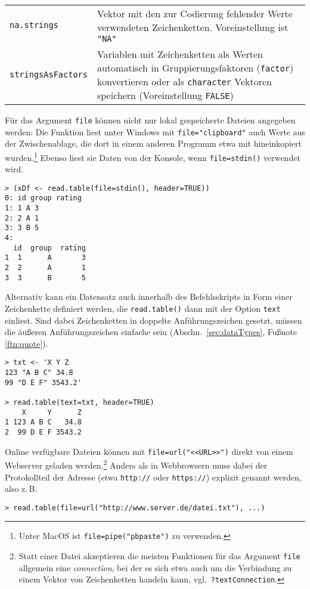 \begin{longtable}{p{3.2cm}p{9.3cm}}
\lstinline!na.strings! & Vektor mit den zur Codierung fehlender Werte verwendeten Zeichenketten. Voreinstellung ist \lstinline!"NA"!\\
\lstinline!stringsAsFactors!\index{Zeichenketten!Umwandlung in Faktor} & Variablen mit Zeichenketten als Werten automatisch in Gruppierungsfaktoren (\lstinline!factor!) konvertieren oder als \lstinline!character! Vektoren speichern (Voreinstellung \lstinline!FALSE!)\\\hline
\end{longtable}

Für das Argument \lstinline!file! können nicht nur lokal gespeicherte Dateien angegeben werden: Die Funktion liest unter Windows mit \lstinline!file="clipboard"! auch Werte aus der Zwischenablage, die dort in einem anderen Programm etwa mit  hineinkopiert wurden.\footnote{\label{ftn:pbpaste}Unter MacOS ist \lstinline!file=pipe("pbpaste")! zu verwenden.} Ebenso liest sie Daten von der Konsole, wenn \lstinline!file=stdin()! verwendet wird.
\begin{lstlisting}
> (xDf <- read.table(file=stdin(), header=TRUE))
0: id group rating
1: 1 A 3
2: 2 A 1
3: 3 B 5
4:
  id  group  rating
1  1      A       3
2  2      A       1
3  3      B       5
\end{lstlisting}

Alternativ kann ein Datensatz auch innerhalb des Befehlsskripts in Form einer Zeichenkette definiert werden, die \lstinline!read.table()! dann mit der Option \lstinline!text! einliest. Sind dabei Zeichenketten in doppelte Anführungszeichen gesetzt, müssen die äußeren Anführungszeichen einfache sein (Abschn.\ \ref{sec:dataTypes}, Fußnote \ref{ftn:quote}).
\begin{lstlisting}
> txt <- 'X Y Z
123 "A B C" 34.8
99 "D E F" 3543.2'

> read.table(text=txt, header=TRUE)
    X     Y      Z
1 123 A B C   34.8
2  99 D E F 3543.2
\end{lstlisting}

Online verfügbare Dateien können mit \lstinline!file=url("<<URL>>")! direkt von einem Webserver geladen werden.\footnote{Statt einer Datei akzeptieren die meisten Funktionen für das Argument \lstinline!file! allgemein eine \emph{connection}, bei der es sich etwa auch um die Verbindung zu einem Vektor von Zeichenketten handeln kann, vgl.\ \lstinline!?textConnection!.} Anders als in Webbrowsern muss dabei der Protokollteil der Adresse (etwa \lstinline!http://! oder \lstinline!https://!) explizit genannt werden, also z.\,B.\
\begin{lstlisting}
> read.table(file=url("http://www.server.de/datei.txt"), ...)
\end{lstlisting}

